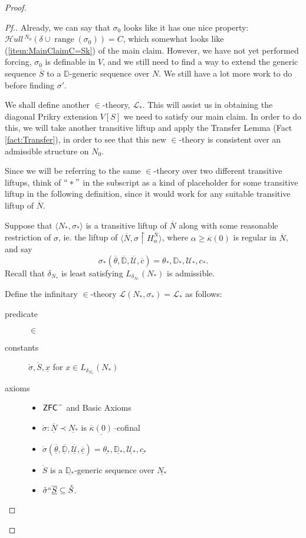 \documentclass{amsart}
\theoremstyle{definition}
\theoremstyle{remark}
\newcommand{\D}{\mathbb{D}}
\newcommand{\N}{{\overline{N}}}
\renewcommand{\S}{{\overline{S}}}
\newcommand{\U}{\mathcal{U}}
\newcommand{\ZFC}{\textup{\ensuremath{\textsf{ZFC}}}}
\DeclareMathOperator{\ran}{range}
\newcommand{\rest}{\mathbin{\upharpoonright}}
\newcommand{\SH}{\mathcal{H}\textit{ull} \,}
\newcommand{\sk}[3]{\SH^{#1}( {#2} \cup {\ran(#3)} ) }
\begin{document}
\begin{proof}
\begin{proof}[Pf.]
Already, we can say that $\sigma_0$ looks like it has one nice property: $\sk{N_0}{\delta}{\sigma_0}= C$, which somewhat looks like (\ref{item:MainClaimC=Sk}) of the main claim. However, we have not yet performed forcing, $\sigma_0$ is definable in $V$, and we still need to find a way to extend the generic sequence $\S$ to a $\D$-generic sequence over $N$. We still have a lot more work to do before finding $\sigma'$.

We shall define another $\in$-theory, $\mathcal L_*$. This will assist us in obtaining the diagonal Prikry extension $V[S]$ we need to satisfy our main claim. In order to do this, we will take another transitive liftup and apply the Transfer Lemma (Fact \ref{fact:Transfer}), in order to see that this new $\in$-theory is consistent over an admissible structure on $N_0$. 

Since we will be referring to the same $\in$-theory over two different transitive liftups, think of $``*"$ in the subscript as a kind of placeholder for some transitive liftup in the following definition, since it would work for any suitable transitive liftup of $\N$.

Suppose that $\langle N_*, \sigma_* \rangle$ is a transitive liftup of $\N$ along with some reasonable restriction of $\sigma$, ie. the liftup of $\langle \N, \sigma \rest H_{\alpha}^{\N} \rangle$, where $\alpha \geq \overline \kappa(0)$ is regular in $\N$, and say $$\sigma_*(\overline \theta, \overline{\D}, \overline{\U}, \overline c) = \theta_*, \D_*, \U_*, c_*.$$ Recall that $\delta_{N_*}$ is least satisfying $L_{\delta_{N_*}}(N_*)$ is admissible. 

Define the infinitary $\in$-theory $\mathcal L(N_*, \sigma_*)=\mathcal L_*$ as follows: 

\begin{description}
	\item[predicate] $\in$ 
	\item[constants] $\mathring{\sigma}, \mathring S, \underline x$ for $x \in L_{\delta_{N_*}}(N_*)$
	\item[axioms] \begin{itemize} \item $\ZFC^-$ and \textsf{Basic Axioms}
		\item $\mathring \sigma : \underline \N \prec \underline{N_*}$ is $\underline{\overline \kappa(0)}$--cofinal
		\item $\mathring{\sigma}(\overline{\underline{\theta}}, \overline{\underline{\D}}, \overline{\underline{\U}}, \overline{\underline c})=\underline{\theta_*}, \underline{\D_*}, \underline{\U_*}, \underline{c_*}$
		\item $\mathring S$ is a $\underline{\D_*}$-generic sequence over $\underline{N_*}$
		\item $\mathring \sigma ``\overline{\underline S} \subseteq \mathring S$.
	\end{itemize}
\end{description} 


\end{proof}
\end{proof}
\end{document}
